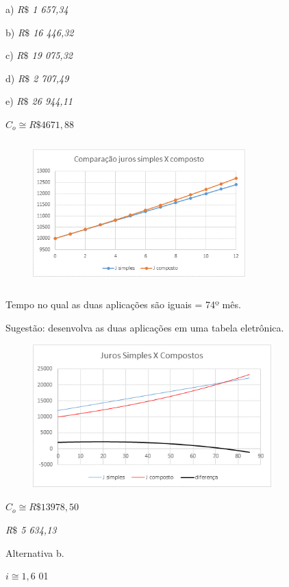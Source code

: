 \begin{respostas}{4}
\ansitem{} a) \textit{R$\$$  1 657,34}

 b) \textit{R$\$$  16 446,32}

 c) \textit{R$\$$  19 075,32}

 d) \textit{R$\$$  2 707,49}

 e) \textit{R$\$$  26 944,11}

\ansitem{} \( C_{o} \cong  R\$ 4 671,88 \) 

\begin{figure}[H]
    \ansitem{}

	\begin{Center}
		\includegraphics[width=3.23in,height=2.2in]{capitulos/potencias_e_funcoes_exponenciais/media/image41.png}
	\end{Center}
\end{figure}

\ansitem{} Tempo no qual as duas aplicações são iguais = 74º mês.

Sugestão: desenvolva as duas aplicações em uma tabela eletrônica.

\begin{figure}[H]
	\begin{Center}
		\includegraphics[width=3.62in,height=2.18in]{capitulos/potencias_e_funcoes_exponenciais/media/image42.png}
	\end{Center}
\end{figure}

\ansitem{}  \( C_{o} \cong  R\$ 13 978,50 \) 

\ansitem{} \textit{R$\$$  5 634,13}

\ansitem{} Alternativa b.

\ansitem{}  \( i \cong 1,6 \) 01
\end{respostas}